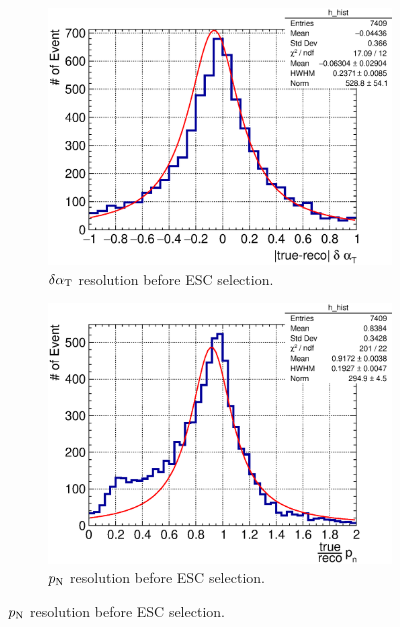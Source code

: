         \begin{figure}[!htb] 
           \centering
           \begin{subfigure}{0.45\textwidth}
                \includegraphics[width=\textwidth]{figures/dalphat_rat_hist_al13.eps}
                \caption{$\delta\alpha_\textrm{T}$ resolution before ESC selection.}
                \label{fig:dat-res-bfESC}
           \end{subfigure}
           \begin{subfigure}{0.45\textwidth}
                \includegraphics[width=\textwidth]{figures/pn_rat_hist_al13.eps}
                \caption{$p_\textrm{N}$ resolution before ESC selection.}
                \label{fig:pn-res-bfESC}
           \end{subfigure}

\end{figure}
